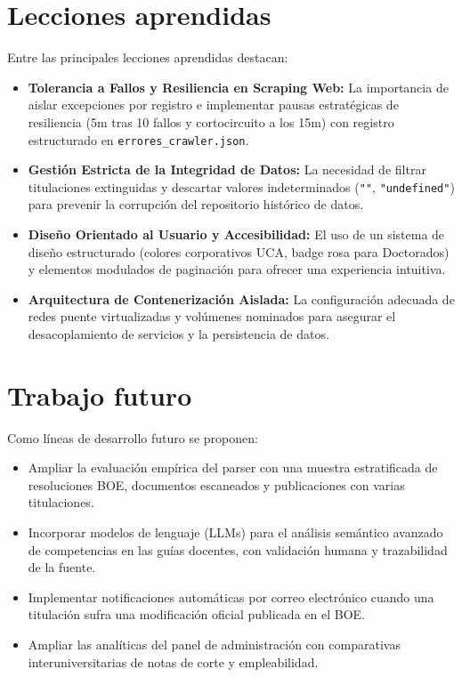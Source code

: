 \section{Lecciones aprendidas}
Entre las principales lecciones aprendidas destacan:
\begin{itemize}
    \item \textbf{Tolerancia a Fallos y Resiliencia en Scraping Web:} La importancia de aislar excepciones por registro e implementar pausas estratégicas de resiliencia (5m tras 10 fallos y cortocircuito a los 15m) con registro estructurado en \texttt{errores\_crawler.json}.
    \item \textbf{Gestión Estricta de la Integridad de Datos:} La necesidad de filtrar titulaciones extinguidas y descartar valores indeterminados (\texttt{""}, \texttt{"undefined"}) para prevenir la corrupción del repositorio histórico de datos.
    \item \textbf{Diseño Orientado al Usuario y Accesibilidad:} El uso de un sistema de diseño estructurado (colores corporativos UCA, badge rosa para Doctorados) y elementos modulados de paginación para ofrecer una experiencia intuitiva.
    \item \textbf{Arquitectura de Contenerización Aislada:} La configuración adecuada de redes puente virtualizadas y volúmenes nominados para asegurar el desacoplamiento de servicios y la persistencia de datos.
\end{itemize}

\section{Trabajo futuro}
Como líneas de desarrollo futuro se proponen:
\begin{itemize}
    \item Ampliar la evaluación empírica del parser con una muestra estratificada de resoluciones BOE, documentos escaneados y publicaciones con varias titulaciones.
    \item Incorporar modelos de lenguaje (LLMs) para el análisis semántico avanzado de competencias en las guías docentes, con validación humana y trazabilidad de la fuente.
    \item Implementar notificaciones automáticas por correo electrónico cuando una titulación sufra una modificación oficial publicada en el BOE.
    \item Ampliar las analíticas del panel de administración con comparativas interuniversitarias de notas de corte y empleabilidad.
\end{itemize}
